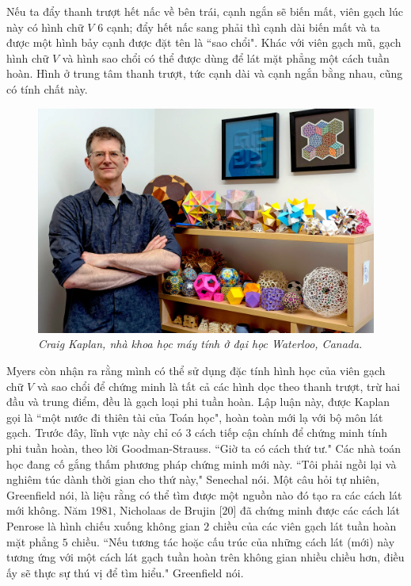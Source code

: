 \begin{multicols}{2}
	\vskip 0.1cm
	Nếu ta đẩy thanh trượt hết nấc về bên trái, cạnh ngắn sẽ biến mất, viên gạch lúc này có hình chữ $V$ $6$ cạnh;  đẩy hết nấc sang phải thì cạnh dài biến mất và ta được một hình bảy cạnh được đặt tên là ``sao chổi".  Khác với viên gạch mũ, gạch hình chữ $V$ và hình sao chổi có thể được dùng để lát mặt phẳng một cách tuần hoàn. Hình ở trung tâm thanh trượt, tức cạnh dài và cạnh ngắn bằng nhau, cũng có tính chất này.
	\begin{figure}[H]
		\vspace*{-5pt}
		\centering
		\captionsetup{labelformat= empty, justification=centering}
		\includegraphics[width= 1\linewidth]{6}
		\caption{\small\textit{\color{duongvaotoanhoc}Craig Kaplan, nhà khoa học máy tính ở đại học Waterloo, Canada.}}
		\vspace*{-10pt}
	\end{figure}
	Myers còn nhận ra rằng mình có thể sử dụng đặc tính hình học của viên gạch chữ $V$ và sao chổi để chứng minh là tất cả các hình dọc theo thanh trượt, trừ hai đầu và trung điểm, đều là gạch loại phi tuần hoàn. Lập luận này, được Kaplan gọi là ``một nước đi thiên tài của Toán học", hoàn toàn mới lạ với bộ môn lát gạch. Trước đây, lĩnh vực này chỉ có $3$ cách tiếp cận chính để chứng minh tính phi tuần hoàn, theo lời Goodman-Strauss. ``Giờ ta có cách thứ tư." 
	\vskip 0.1cm
	Các nhà toán học đang cố gắng thấm phương pháp chứng minh mới này. ``Tôi phải ngồi lại và nghiêm túc dành thời gian cho thứ này," Senechal nói. 
	\vskip 0.1cm
	Một câu hỏi tự nhiên, Greenfield nói, là liệu rằng có thể tìm được một nguồn nào đó tạo ra các cách lát mới không. Năm $1981$, Nicholaas de Brujin [$20$] đã chứng minh được các cách lát Penrose là hình chiếu xuống không gian $2$ chiều của các viên gạch lát tuần hoàn mặt phẳng $5$ chiều. ``Nếu tương tác hoặc cấu trúc của những cách lát (mới) này tương ứng với một cách lát gạch tuần hoàn trên không gian nhiều chiều hơn, điều ấy sẽ thực sự thú vị để tìm hiểu." Greenfield nói.

\end{multicols}
